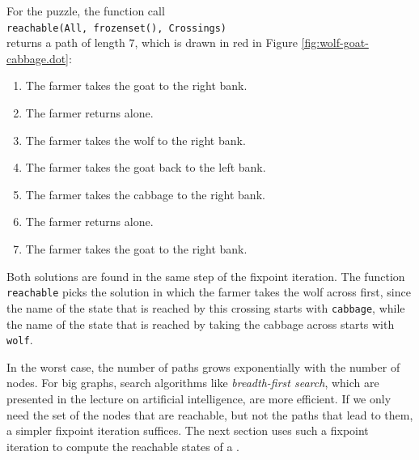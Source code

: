 For the puzzle, the function call
\\[0.2cm]
\hspace*{1.3cm}
\texttt{reachable(All, frozenset(), Crossings)}
\\[0.2cm]
returns a path of length $7$, which is drawn in red in Figure \ref{fig:wolf-goat-cabbage.dot}:
\begin{enumerate}
\item The farmer takes the goat to the right bank.
\item The farmer returns alone.
\item The farmer takes the wolf to the right bank.
\item The farmer takes the goat back to the left bank.
\item The farmer takes the cabbage to the right bank.
\item The farmer returns alone.
\item The farmer takes the goat to the right bank.
\end{enumerate}
Both solutions are found in the same step of the fixpoint iteration.  The function \texttt{reachable} picks the
solution in which the farmer takes the wolf across first, since the name of the state that is reached by this
crossing starts with \texttt{cabbage}, while the name of the state that is reached by taking the cabbage across
starts with \texttt{wolf}.

In the worst case, the number of paths grows exponentially with the number of nodes.  For big graphs, search
algorithms like \textsl{breadth-first search}, which are presented in the lecture on
artificial intelligence, are more efficient.  If we only need the set of the nodes that are reachable, but not the
paths that lead to them, a simpler fixpoint iteration suffices.  The next section uses such a fixpoint iteration to
compute the reachable states of a .

